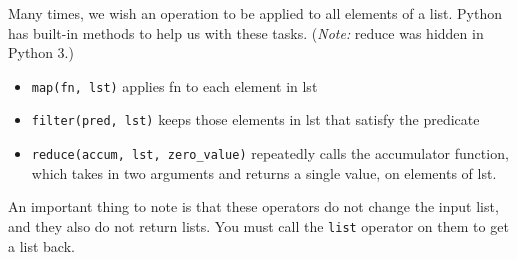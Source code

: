Many times, we wish an operation to be applied to all elements of a list.
Python has built-in methods to help us with these tasks. ({\it Note:} reduce
was hidden in Python 3.)

\begin{itemize}
\item {\tt map(fn, lst)} applies fn to each element in lst
\item {\tt filter(pred, lst)} keeps those elements in lst that satisfy the
predicate
\item {\tt reduce(accum, lst, zero\_value)} repeatedly calls the accumulator
function, which takes in two arguments and returns a single value, on elements
of lst.
\end{itemize}

An important thing to note is that these operators do not change the input list, and they also do not return lists. You must call the {\tt list} operator on them to get a list back. 
